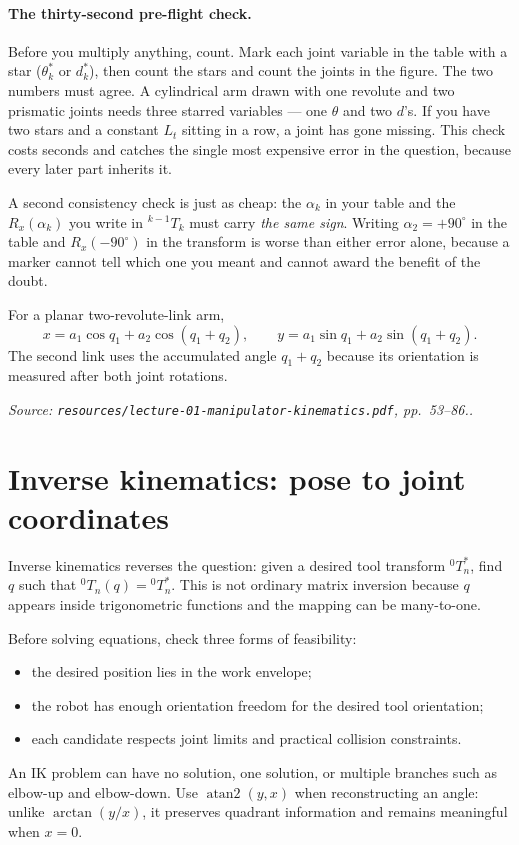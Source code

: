 \documentclass[11pt,a4paper]{article}
\renewcommand{\texttt}[1]{\nolinkurl{#1}}
\newcommand{\source}[1]{\par\smallskip\noindent\textit{Source: #1.}\par\smallskip}
\begin{document}
\paragraph{The thirty-second pre-flight check.}
Before you multiply anything, count. Mark each joint variable in the table with a star
($\theta_k^\ast$ or $d_k^\ast$), then count the stars and count the joints in the figure. The two
numbers must agree. A cylindrical arm drawn with one revolute and two prismatic joints needs three
starred variables --- one $\theta$ and two $d$'s. If you have two stars and a constant $L_t$ sitting
in a row, a joint has gone missing. This check costs seconds and catches the single most expensive
error in the question, because every later part inherits it.

A second consistency check is just as cheap: the $\alpha_k$ in your table and the
$R_x(\alpha_k)$ you write in ${}^{k-1}T_k$ must carry \emph{the same sign}. Writing
$\alpha_2=+90^\circ$ in the table and $R_x(-90^\circ)$ in the transform is worse than either
error alone, because a marker cannot tell which one you meant and cannot award the benefit of the
doubt.

For a planar two-revolute-link arm,
\[
 x=a_1\cos q_1+a_2\cos(q_1+q_2),\qquad
 y=a_1\sin q_1+a_2\sin(q_1+q_2).
\]
The second link uses the accumulated angle $q_1+q_2$ because its orientation is measured after both joint rotations.
\source{\texttt{resources/lecture-01-manipulator-kinematics.pdf}, pp.~53--86.}

\section{\enspace Inverse kinematics: pose to joint coordinates}
Inverse kinematics reverses the question: given a desired tool transform $^0T_n^*$, find $q$ such that $^0T_n(q)= {}^0T_n^*$. This is not ordinary matrix inversion because $q$ appears inside trigonometric functions and the mapping can be many-to-one.

Before solving equations, check three forms of feasibility:
\begin{itemize}
\item the desired position lies in the work envelope;
\item the robot has enough orientation freedom for the desired tool orientation;
\item each candidate respects joint limits and practical collision constraints.
\end{itemize}
An IK problem can have no solution, one solution, or multiple branches such as elbow-up and elbow-down. Use $\operatorname{atan2}(y,x)$ when reconstructing an angle: unlike $\arctan(y/x)$, it preserves quadrant information and remains meaningful when $x=0$.
\end{document}

